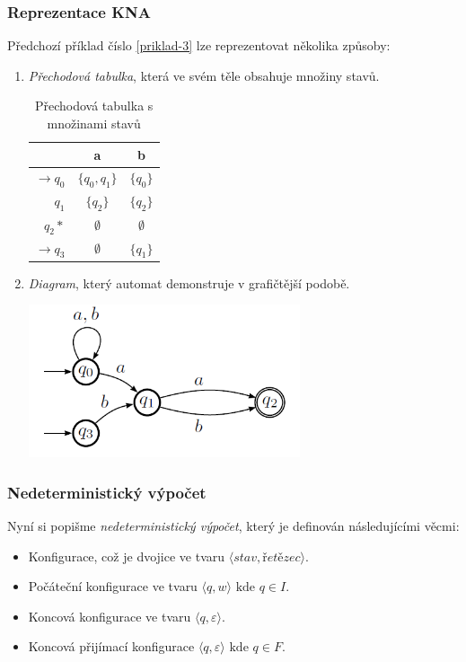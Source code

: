 \documentclass[10pt,a4paper]{article}
\theoremstyle{note}
\begin{document}
\subsubsection{Reprezentace KNA}
Předchozí příklad číslo \ref{priklad-3} lze reprezentovat několika způsoby:
\begin{enumerate}
\item
\textit{Přechodová tabulka}, která ve svém těle obsahuje množiny stavů.
\begin{table}[h]
\begin{center}
\begin{tabular}{ r || c | c }                   
   & a & b \\
   \hline
   $ \rightarrow q_{0} $ & $ \lbrace q_{0},q_{1} \rbrace $ & $ \lbrace q_{0} \rbrace $ \\
   $ q_{1} $ & $ \lbrace q_{2} \rbrace $ & $ \lbrace q_{2} \rbrace $ \\
   $ q_{2} * $ & $ \emptyset $ & $ \emptyset $ \\
   $ \rightarrow q_{3} $ & $ \emptyset $ & $ \lbrace q_{1} \rbrace $ \\ 
\end{tabular}
\end{center}
\caption{Přechodová tabulka s množinami stavů}
\end{table}

\item
\textit{Diagram}, který automat demonstruje v grafičtější podobě.

\begin{center}
\includegraphics[width=8cm]{img/KNA.png}
\end{center}


\end{enumerate}


\subsubsection{Nedeterministický výpočet}
Nyní si popišme \textit{nedeterministický výpočet}, který je definován následujícími věcmi:
\begin{itemize}
\item
Konfigurace, což je dvojice ve tvaru $\langle \textit{stav}, \textit{řetězec} \rangle $.
\item
Počáteční konfigurace ve tvaru $\langle q, w \rangle \text{ kde } q \in I$.
\item
Koncová konfigurace ve tvaru $\langle q, \varepsilon \rangle $.
\item
Koncová přijímací konfigurace $\langle q, \varepsilon \rangle \text{ kde } q \in F$.
\end{itemize}
\end{document}
